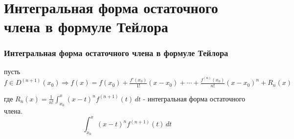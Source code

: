 \part{Интегральная форма остаточного члена в формуле Тейлора}
\section{Интегральная форма остаточного члена в формуле Тейлора}

пусть $ f \in D^{(n+1)} (x_0) \Rightarrow f(x) = f(x_0) + \frac{f'(x_0)}{1!}(x-x_0) + \cdots + \frac{f^{(n)}(x_0)}{n!}(x-x_0)^n + R_n(x) $

где $ R_n(x) = \frac{1}{n!} \int_{x_0}^{x} (x-t)^n f^{(n+1)}(t) \, dt $ - интегральная форма остаточного члена.
$$
\int_{x_0}^{x} (x-t)^n f^{(n+1)}(t) \, dt 
$$